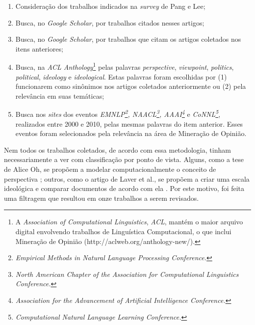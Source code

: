 \begin{enumerate}
\item Consideração dos trabalhos indicados na \emph{survey} de Pang e Lee;
\item Busca, no \emph{Google Scholar}, por trabalhos citados nesses artigos;
\item Busca, no \emph{Google Scholar}, por trabalhos que citam os artigos coletados nos itens anteriores;
\item Busca, na \emph{ACL Anthology}\footnote{A \emph{Association of Computational Linguistics}, \emph{ACL}, mantém o maior arquivo digital envolvendo trabalhos de Linguística Computacional, o que inclui Mineração de Opinião (http://aclweb.org/anthology-new/).} pelas palavras \emph{perspective}, \emph{viewpoint}, \emph{politics}, \emph{political}, \emph{ideology} e \emph{ideological}. Estas palavras foram escolhidas por (1) funcionarem como sinônimos nos artigos coletados anteriormente ou (2) pela relevância em suas temáticas;
\item Busca nos \emph{sites} dos eventos \emph{EMNLP\footnote{\emph{Empirical Methods in Natural Language Processing Conference.}}, NAACL\footnote{\emph{North American Chapter of the Association for Computational Linguistics Conference.}}, AAAI\footnote{\emph{Association for the Advancement of Artificial Intelligence Conference.}}} e \emph{CoNNL\footnote{\emph{Computational Natural Language Learning Conference.}}}, realizados entre 2000 e 2010, pelas mesmas palavras do item anterior. Esses eventos foram selecionados pela relevância na área de Mineração de Opinião. 
\end{enumerate}

Nem todos os trabalhos coletados, de acordo com essa metodologia, tinham necessariamente a ver com classificação por ponto de vista. Alguns, como a tese de Alice Oh, se propõem a modelar computacionalmente o conceito de perspectiva \cite{alice-oh}; outros, como o artigo de Laver et al., se propõem a criar uma escala ideológica e comparar documentos de acordo com ela \cite{wordscores}.  Por este motivo, foi feita uma filtragem que resultou em onze trabalhos a serem revisados. 

